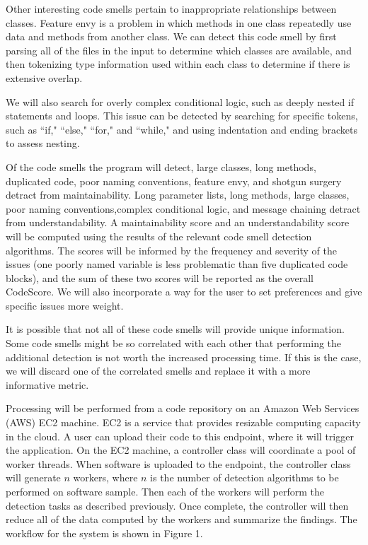 \documentclass{sig-alternate}
\begin{document}
Other interesting code smells pertain to inappropriate relationships between classes. Feature envy is a problem in which methods in one class repeatedly use data and methods from another class. We can detect this code smell by first parsing all of the files in the input to determine which classes are available, and then tokenizing type information used within each class to determine if there is extensive overlap. 

We will also search for overly complex conditional logic, such as deeply nested if statements and loops. This issue can be detected by searching for specific tokens, such as ``if," ``else," ``for," and ``while," and using indentation and ending brackets to assess nesting.

Of the code smells the program will detect, large classes, long methods, duplicated code, poor naming conventions, feature envy, and shotgun surgery detract from maintainability. Long parameter lists, long methods, large classes, poor naming conventions,complex conditional logic, and message chaining detract from understandability. A maintainability score and an understandability score will be computed using the results of the relevant code smell detection algorithms. The scores will be informed by the frequency and severity of the issues (one poorly named variable is less problematic than five duplicated code blocks), and the sum of these two scores will be reported as the overall CodeScore. We will also incorporate a way for the user to set preferences and give specific issues more weight.

It is possible that not all of these code smells will provide unique information. Some code smells might be so correlated with each other that performing the additional detection is not worth the increased processing time. If this is the case, we will discard one of the correlated smells and replace it with a more informative metric.

Processing will be performed from a code repository on an Amazon Web Services (AWS) EC2 machine. EC2 is a service that provides resizable computing capacity in the cloud. A user can upload their code to this endpoint, where it will trigger the application. On the EC2 machine, a controller class will coordinate a pool of worker threads. When software is uploaded to the endpoint, the controller class will generate $n$ workers, where $n$ is the number of detection algorithms to be performed on software sample. Then each of the workers will perform the detection tasks as described previously. Once complete, the controller will then reduce all of the data computed by the workers and summarize the findings. The workflow for the system is shown in Figure 1. 
\end{document}
